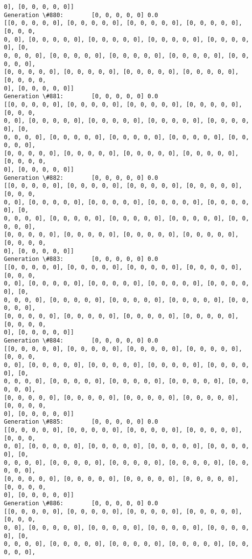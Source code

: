 \documentclass[11pt]{article}
\begin{document}
\begin{Verbatim}[commandchars=\\\{\}]
0], [0, 0, 0, 0, 0]]
Generation \#880:        [0, 0, 0, 0, 0] 0.0
[[0, 0, 0, 0, 0], [0, 0, 0, 0, 0], [0, 0, 0, 0, 0], [0, 0, 0, 0, 0], [0, 0, 0,
0, 0], [0, 0, 0, 0, 0], [0, 0, 0, 0, 0], [0, 0, 0, 0, 0], [0, 0, 0, 0, 0], [0,
0, 0, 0, 0], [0, 0, 0, 0, 0], [0, 0, 0, 0, 0], [0, 0, 0, 0, 0], [0, 0, 0, 0, 0],
[0, 0, 0, 0, 0], [0, 0, 0, 0, 0], [0, 0, 0, 0, 0], [0, 0, 0, 0, 0], [0, 0, 0, 0,
0], [0, 0, 0, 0, 0]]
Generation \#881:        [0, 0, 0, 0, 0] 0.0
[[0, 0, 0, 0, 0], [0, 0, 0, 0, 0], [0, 0, 0, 0, 0], [0, 0, 0, 0, 0], [0, 0, 0,
0, 0], [0, 0, 0, 0, 0], [0, 0, 0, 0, 0], [0, 0, 0, 0, 0], [0, 0, 0, 0, 0], [0,
0, 0, 0, 0], [0, 0, 0, 0, 0], [0, 0, 0, 0, 0], [0, 0, 0, 0, 0], [0, 0, 0, 0, 0],
[0, 0, 0, 0, 0], [0, 0, 0, 0, 0], [0, 0, 0, 0, 0], [0, 0, 0, 0, 0], [0, 0, 0, 0,
0], [0, 0, 0, 0, 0]]
Generation \#882:        [0, 0, 0, 0, 0] 0.0
[[0, 0, 0, 0, 0], [0, 0, 0, 0, 0], [0, 0, 0, 0, 0], [0, 0, 0, 0, 0], [0, 0, 0,
0, 0], [0, 0, 0, 0, 0], [0, 0, 0, 0, 0], [0, 0, 0, 0, 0], [0, 0, 0, 0, 0], [0,
0, 0, 0, 0], [0, 0, 0, 0, 0], [0, 0, 0, 0, 0], [0, 0, 0, 0, 0], [0, 0, 0, 0, 0],
[0, 0, 0, 0, 0], [0, 0, 0, 0, 0], [0, 0, 0, 0, 0], [0, 0, 0, 0, 0], [0, 0, 0, 0,
0], [0, 0, 0, 0, 0]]
Generation \#883:        [0, 0, 0, 0, 0] 0.0
[[0, 0, 0, 0, 0], [0, 0, 0, 0, 0], [0, 0, 0, 0, 0], [0, 0, 0, 0, 0], [0, 0, 0,
0, 0], [0, 0, 0, 0, 0], [0, 0, 0, 0, 0], [0, 0, 0, 0, 0], [0, 0, 0, 0, 0], [0,
0, 0, 0, 0], [0, 0, 0, 0, 0], [0, 0, 0, 0, 0], [0, 0, 0, 0, 0], [0, 0, 0, 0, 0],
[0, 0, 0, 0, 0], [0, 0, 0, 0, 0], [0, 0, 0, 0, 0], [0, 0, 0, 0, 0], [0, 0, 0, 0,
0], [0, 0, 0, 0, 0]]
Generation \#884:        [0, 0, 0, 0, 0] 0.0
[[0, 0, 0, 0, 0], [0, 0, 0, 0, 0], [0, 0, 0, 0, 0], [0, 0, 0, 0, 0], [0, 0, 0,
0, 0], [0, 0, 0, 0, 0], [0, 0, 0, 0, 0], [0, 0, 0, 0, 0], [0, 0, 0, 0, 0], [0,
0, 0, 0, 0], [0, 0, 0, 0, 0], [0, 0, 0, 0, 0], [0, 0, 0, 0, 0], [0, 0, 0, 0, 0],
[0, 0, 0, 0, 0], [0, 0, 0, 0, 0], [0, 0, 0, 0, 0], [0, 0, 0, 0, 0], [0, 0, 0, 0,
0], [0, 0, 0, 0, 0]]
Generation \#885:        [0, 0, 0, 0, 0] 0.0
[[0, 0, 0, 0, 0], [0, 0, 0, 0, 0], [0, 0, 0, 0, 0], [0, 0, 0, 0, 0], [0, 0, 0,
0, 0], [0, 0, 0, 0, 0], [0, 0, 0, 0, 0], [0, 0, 0, 0, 0], [0, 0, 0, 0, 0], [0,
0, 0, 0, 0], [0, 0, 0, 0, 0], [0, 0, 0, 0, 0], [0, 0, 0, 0, 0], [0, 0, 0, 0, 0],
[0, 0, 0, 0, 0], [0, 0, 0, 0, 0], [0, 0, 0, 0, 0], [0, 0, 0, 0, 0], [0, 0, 0, 0,
0], [0, 0, 0, 0, 0]]
Generation \#886:        [0, 0, 0, 0, 0] 0.0
[[0, 0, 0, 0, 0], [0, 0, 0, 0, 0], [0, 0, 0, 0, 0], [0, 0, 0, 0, 0], [0, 0, 0,
0, 0], [0, 0, 0, 0, 0], [0, 0, 0, 0, 0], [0, 0, 0, 0, 0], [0, 0, 0, 0, 0], [0,
0, 0, 0, 0], [0, 0, 0, 0, 0], [0, 0, 0, 0, 0], [0, 0, 0, 0, 0], [0, 0, 0, 0, 0],

\end{Verbatim}
\end{document}
